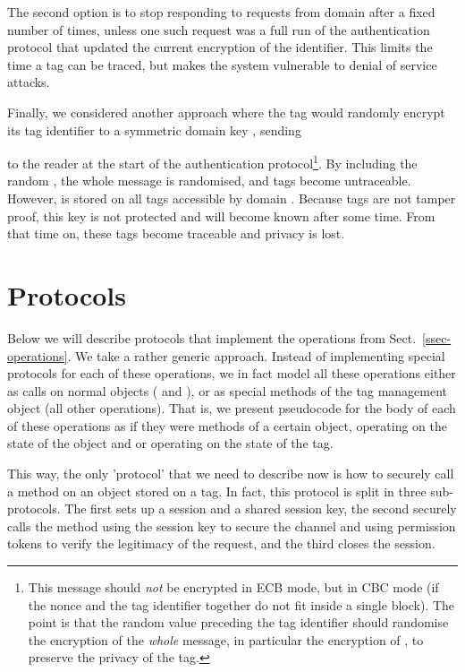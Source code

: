 The second option is to stop responding to requests from domain  after
a fixed number of times, unless one such request was a full run of the
authentication protocol that updated the current encryption of the
identifier. This limits the time a tag can be traced, but
makes the system vulnerable to denial of service attacks.

Finally, we considered another approach where the tag would randomly encrypt
its tag identifier to a symmetric domain key , sending

to the reader at the start of the authentication protocol\footnote{This message should \emph{not} be encrypted in ECB mode, but in CBC
	mode (if the nonce and the tag identifier together do not fit
	inside a single block). The point is that the random value 
	preceding the tag identifier should randomise the encryption of the
	\emph{whole} message, in particular the encryption of , to  
	preserve the privacy of the tag.
}. By including the
random , the whole message is randomised, and tags become
untraceable. However,  is stored on all tags accessible by domain
. Because tags are not tamper proof, this key is not protected and will
become known after some time. From that time on, these tags become traceable
and privacy is lost.



\section{Protocols}
\label{sec-prot}

Below we will describe protocols that implement the operations
from Sect.~\ref{ssec-operations}. We take a rather generic approach. Instead of
implementing special protocols for each of these operations, we
in fact model all these operations
either as calls on normal objects ( and
), or as  
special methods of the tag management object  (all other
operations).
That is, we present pseudocode for the body of each of these operations as if
they were methods of a certain object, operating on the state of the object and
or operating on the state of the tag. 

This way, the only 'protocol' that we need to
describe now is how to securely call a method on an object stored on a tag. In
fact, this protocol is split in three sub-protocols. The first sets up a
session and a shared session key, the second securely calls the method using
the session key to secure the channel and using permission tokens to verify the
legitimacy of the request, and the third closes the session.

